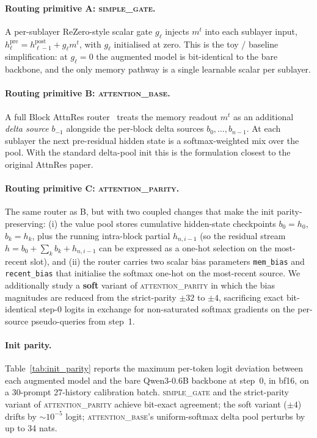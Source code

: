 \documentclass{article}
\begin{document}
\paragraph{Routing primitive A: \textsc{simple\_gate}.}
A per-sublayer ReZero-style scalar gate $g_\ell$ injects $m^t$ into
each sublayer input, $h^{\text{pre}}_\ell = h^{\text{post}}_{\ell-1} + g_\ell m^t$,
with $g_\ell$ initialised at zero. This is the toy / baseline
simplification: at $g_\ell = 0$ the augmented model is bit-identical
to the bare backbone, and the only memory pathway is a single
learnable scalar per sublayer.

\paragraph{Routing primitive B: \textsc{attention\_base}.}
A full Block AttnRes router~\cite{du2025blockattnres} treats the
memory readout $m^t$ as an additional \emph{delta source} $b_{-1}$
alongside the per-block delta sources $b_0, \dots, b_{n-1}$. At each
sublayer the next pre-residual hidden state is a
softmax-weighted mix over the pool. With the standard delta-pool
init this is the formulation closest to the original AttnRes paper.

\paragraph{Routing primitive C: \textsc{attention\_parity}.}
The same router as B, but with two coupled changes that make the
init parity-preserving: (i) the value pool stores cumulative
hidden-state checkpoints $b_0 = h_0$, $b_k = h_k$, plus the running
intra-block partial $h_{n,i-1}$ (so the residual stream
$h = b_0 + \sum_k b_k + h_{n,i-1}$ can be expressed as a one-hot
selection on the most-recent slot), and (ii) the router carries
two scalar bias parameters \texttt{mem\_bias} and \texttt{recent\_bias}
that initialise the softmax one-hot on the most-recent source.
We additionally study a \textbf{soft} variant of \textsc{attention\_parity}
in which the bias magnitudes are reduced from the strict-parity
$\pm 32$ to $\pm 4$, sacrificing exact bit-identical step-0 logits
in exchange for non-saturated softmax gradients on the per-source
pseudo-queries from step~1.

\paragraph{Init parity.}
Table~\ref{tab:init_parity} reports the maximum per-token logit
deviation between each augmented model and the bare Qwen3-0.6B
backbone at step~0, in bf16, on a 30-prompt 27-history calibration
batch. \textsc{simple\_gate} and the strict-parity variant of
\textsc{attention\_parity} achieve bit-exact agreement; the soft
variant ($\pm 4$) drifts by $\sim 10^{-5}$ logit; \textsc{attention\_base}'s
uniform-softmax delta pool perturbs by up to 34 nats.
\end{document}
